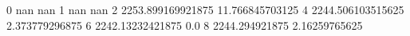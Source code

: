 0 nan nan
1 nan nan
2 2253.899169921875 11.766845703125
4 2244.506103515625 2.373779296875
6 2242.13232421875 0.0
8 2244.294921875 2.16259765625
